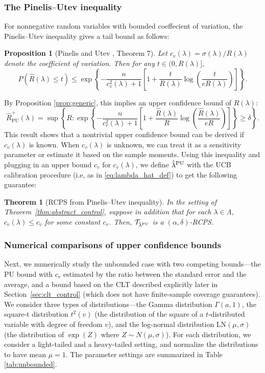\documentclass[10pt]{article}
\newtheorem{theorem}{Theorem}
\newtheorem{prop}{Proposition}
\newcommand{\T}{\mathcal{T}}
\newcommand{\Rhat}{\widehat{R}}
\begin{document}
\subsubsection{The Pinelis--Utev inequality}
For nonnegative random variables with bounded coeffecient of variation, the Pinelis--Utev inequality gives a tail bound as follows:
\begin{prop}[Pinelis and Utev \cite{pinelis1989}, Theorem 7]
\label{prop:pinelis_utev}
    Let 
    $c_v(\lambda) = \sigma(\lambda) / R(\lambda)$
    denote the coefficient of variation. Then for any $t \in (0, R(\lambda)]$,
    \begin{equation}
    P(\Rhat(\lambda) \le t) 
    \le \exp \left\{-\frac{n}{c_v^2(\lambda) + 1}\left[1 + \frac{t}{R(\lambda)}\log\left(\frac{t}{e R(\lambda)}\right) \right] \right\}.
\end{equation}
\end{prop}
By Proposition \ref{prop:generic}, this implies an upper confidence bound of $R(\lambda)$: 
\begin{equation}\label{eq:Rhat_PU}
\Rhat_{\mathrm{PU}}^+(\lambda) = \sup\left\{R: \exp \left\{-\frac{n}{c_v^2(\lambda) + 1}\left[1 + \frac{\Rhat(\lambda)}{R}\log\left(\frac{\Rhat(\lambda)}{e R}\right) \right] \right\}\ge \delta\right\}.
\end{equation}
This result shows that a nontrivial upper confidence bound can be derived if $c_v(\lambda)$ is known. When $c_v(\lambda)$ is unknown, we can treat it as a sensitivity parameter or estimate it based on the sample moments.   
Using this inequality and plugging in an upper bound $c_v$ for $c_v(\lambda)$, we define $\hat{\lambda}^{\textnormal{PU}}$ with the UCB calibration procedure (i.e, as in \eqref{eq:lambda_hat_def}) to get the following guarantee:
\begin{theorem}[RCPS from Pinelis--Utev inequality]
\label{thm:PU}
In the setting of Theorem~\ref{thm:abstract_control}, suppose in addition that for each $\lambda \in \Lambda$, $c_v(\lambda) \le c_v$ for some constant $c_v$. Then, $\T_{\hat{\lambda}^{\textnormal{PU}}}$ is a $(\alpha, \delta)$-RCPS.
\end{theorem}

\subsubsection{Numerical comparisons of upper confidence bounds}

Next, we numerically study the unbounded case with two competing bounds---the PU bound with $c_v$ estimated by the ratio between the standard error and the average, and a bound based on the CLT described explicitly later in Section~\ref{sec:clt_control} (which does not have finite-sample coverage guarantees). We consider three types of distributions---the Gamma distribution $\Gamma(a, 1)$, the square-t distribution $t^2(v)$ (the distribution of the square of a $t$-distributed variable with degree of freedom $v$), and the log-normal distribution $\mathrm{LN}(\mu, \sigma)$ (the distribution of $\exp(Z)$ where $Z \sim N(\mu, \sigma)$). For each distribution, we consider a light-tailed and a heavy-tailed setting, and normalize the distributions to have mean $\mu = 1$. The parameter settings are summarized in Table \ref{tab:unbounded}. 
\end{document}
